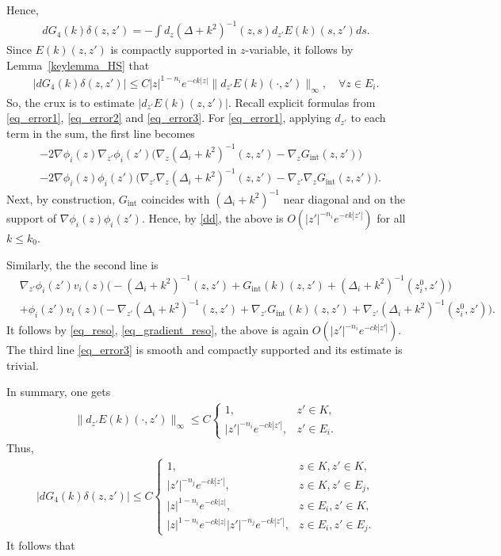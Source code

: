 \documentclass[12pt]{amsart}
\begin{document}
Hence,
\begin{align}
    dG_4(k)\delta (z,z') = - \int d_{z}(\Delta + k^2)^{-1}(z,s) d_{z'}E(k)(s,z') ds.
\end{align}
Since $E(k)(z,z')$ is compactly supported in $z$-variable, it follows by Lemma~\ref{keylemma_HS} that
\begin{align}
    |dG_4(k)\delta (z,z')| \le C |z|^{1-n_i} e^{-ck|z|} \| d_{z'}E(k)(\cdot,z')\|_\infty,\quad \forall z\in E_i.
\end{align}
So, the crux is to estimate $|d_{z'}E(k)(z,z')|$. Recall explicit formulas from \eqref{eq_error1}, \eqref{eq_error2} and \eqref{eq_error3}. For \eqref{eq_error1}, applying $d_{z'}$ to each term in the sum, the first line becomes
\begin{align*}
    &-2 \nabla \phi_i(z) \nabla_{z'}\phi_i(z') \big(\nabla_z (\Delta_{i} + k^2)^{-1}(z,z') - \nabla_z G_{\textrm{int}}(z,z')\big)\\
    &-2 \nabla \phi_i(z) \phi_i(z') \big(\nabla_{z'} \nabla_z (\Delta_{i} + k^2)^{-1}(z,z') - \nabla_{z'} \nabla_z G_{\textrm{int}}(z,z') \big).
\end{align*}
Next, by construction, $G_{\textrm{int}}$ coincides with $(\Delta_i+k^2)^{-1}$ near diagonal and on the support of $\nabla \phi_i(z) \phi_i(z')$. Hence, by \eqref{dd}, the above is $O(|z'|^{-n_i} e^{-ck|z'|})$ for all $k\le k_0$.

Similarly, the the second line is
\begin{align*}
    &\nabla_{z'}\phi_i(z') v_i(z) \big( -(\Delta_{i} + k^2)^{-1}(z,z') + G_{\textrm{int}}(k)(z,z') + (\Delta_{i} + k^2)^{-1}(z_i^0,z')\big)\\
    &+ \phi_i(z') v_i(z) \big( - \nabla_{z'}(\Delta_{i} + k^2)^{-1}(z,z') + \nabla_{z'}G_{\textrm{int}}(k)(z,z') + \nabla_{z'}(\Delta_{i} + k^2)^{-1}(z_i^0,z')\big).
\end{align*}
It follows by \eqref{eq_reso}, \eqref{eq_gradient_reso}, the above is again $O(|z'|^{-n_i}e^{-ck|z'|})$. The third line \eqref{eq_error3} is smooth and compactly supported and its estimate is trivial.

In summary, one gets
\begin{align}\label{43}
     \| d_{z'}E(k)(\cdot,z')\|_\infty \le C \begin{cases}
         1, & z'\in K,\\
        |z'|^{-n_i} e^{-ck|z'|}, & z'\in E_i.
     \end{cases}
\end{align}
Thus,
\begin{align}\label{44}
    |dG_4(k)\delta (z,z')| \le C \begin{cases}
        1, & z\in K, z'\in K,\\
        |z'|^{-n_j} e^{-ck|z'|}, & z\in K, z'\in E_j,\\
        |z|^{1-n_i} e^{-ck|z|}, & z\in E_i, z'\in K,\\
        |z|^{1-n_i} e^{-ck|z|} |z'|^{-n_j} e^{-ck|z'|}, & z\in E_i, z'\in E_j.
    \end{cases}
\end{align}
It follows that
\end{document}
